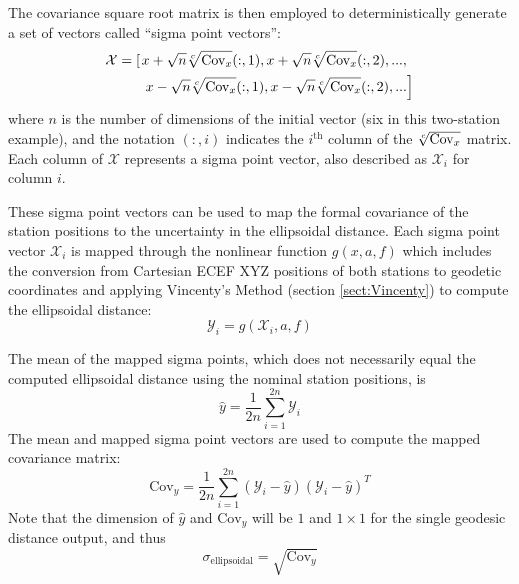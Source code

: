The covariance square root matrix is then employed to deterministically generate a set of vectors called ``sigma point vectors'':
\begin{equation}
\begin{split}
\mathcal{X} = \left[ \right. & x + \sqrt{n} \sqrt[c]{\text{Cov}_x}(:,1),x + \sqrt{n} \sqrt[c]{\text{Cov}_x}(:,2), ... ,  \\
                   & \left.x - \sqrt{n} \sqrt[c]{\text{Cov}_x}(:,1),x - \sqrt{n} \sqrt[c]{\text{Cov}_x}(:,2), ... \right]
\end{split}
\end{equation}
where $n$ is the number of dimensions of the initial vector (six in this two-station example), and the notation $(:,i)$ indicates the $i^{\text{th}}$ column of the $\sqrt[c]{\text{Cov}_x}$ matrix. Each column of $\mathcal{X}$ represents a sigma point vector, also described as $\mathcal{X}_i$ for column $i$. 

These sigma point vectors can be used to map the formal covariance of the station positions to the uncertainty in the ellipsoidal distance. Each sigma point vector $\mathcal{X}_i$ is mapped through the nonlinear function $g(x,a,f)$ which includes the conversion from Cartesian ECEF XYZ positions of both stations to geodetic coordinates and applying Vincenty's Method (section \ref{sect:Vincenty}) to compute the ellipsoidal distance:
\begin{equation}
\mathcal{Y}_i = g(\mathcal{X}_i,a,f)
\end{equation}

The mean of the mapped sigma points, which does not necessarily equal the computed ellipsoidal distance using the nominal station positions, is
\begin{equation}
\hat{y} = \frac{1}{2n} \sum_{i=1}^{2n} \mathcal{Y}_i
\end{equation}
The mean and mapped sigma point vectors are used to compute the mapped covariance matrix:
\begin{equation}
\text{Cov}_y = \frac{1}{2n} \sum_{i=1}^{2n} \left(\mathcal{Y}_i - \hat{y}\right) \left(\mathcal{Y}_i - \hat{y}\right)^T
\end{equation}
Note that the dimension of $\hat{y}$ and $\text{Cov}_y$ will be $1$ and $1 \times 1$ for the single geodesic distance output, and thus
\begin{equation}
\sigma_{\text{ellipsoidal}} = \sqrt{\text{Cov}_y}
\end{equation}



